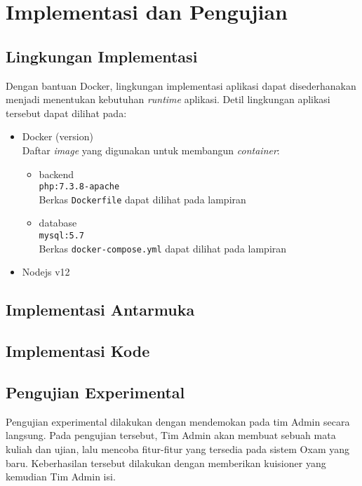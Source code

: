 \chapter{Implementasi dan Pengujian}
\label{chap:implementasi-pengujian}

\section{Lingkungan Implementasi}
Dengan bantuan Docker, lingkungan implementasi aplikasi dapat disederhanakan menjadi menentukan
kebutuhan \textit{runtime} aplikasi. Detil lingkungan aplikasi tersebut dapat dilihat pada:
\begin{itemize}
    \item Docker (version)\\
        Daftar \textit{image} yang digunakan untuk membangun \textit{container}:
        \begin{itemize}
            \item backend\\
                \texttt{php:7.3.8-apache}\\
                Berkas \texttt{Dockerfile} dapat dilihat pada lampiran %
            
            \item database\\
                \texttt{mysql:5.7}\\
                Berkas \texttt{docker-compose.yml} dapat dilihat pada lampiran %
        \end{itemize}
    \item Nodejs v12
\end{itemize}

\section{Implementasi Antarmuka}

\section{Implementasi Kode}


\section{Pengujian Experimental}
Pengujian experimental dilakukan dengan mendemokan pada tim Admin secara langsung. Pada pengujian
tersebut, Tim Admin akan membuat sebuah mata kuliah dan ujian, lalu mencoba fitur-fitur yang tersedia
pada sistem Oxam yang baru. Keberhasilan tersebut dilakukan dengan memberikan kuisioner yang kemudian
Tim Admin isi.

